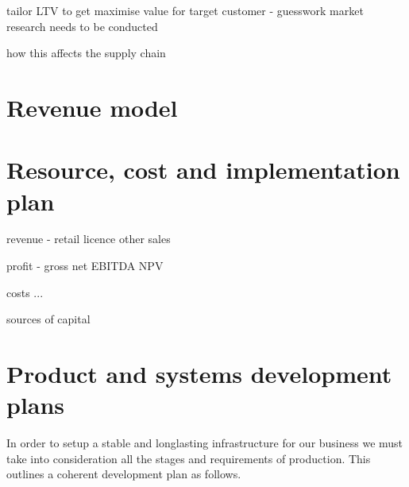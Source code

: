 \documentclass{article}
\begin{document}
tailor LTV to get maximise value for target customer - guesswork market research
needs to be conducted

how this affects the supply chain
\section{Revenue model}
\section{Resource, cost and implementation plan}
revenue
 - retail
   licence
   other sales

profit
 - gross
   net
   EBITDA
   NPV

costs
 ...

sources of capital
\section{Product and systems development plans}
In order to setup a stable and longlasting infrastructure for our business we must take into consideration all the stages and requirements of production. This outlines a coherent development plan as follows.
\end{document}
